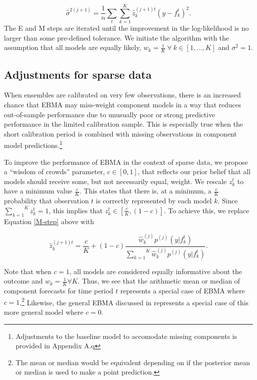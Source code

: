 \documentclass[12pt,fullpage,endnotes]{article}
\begin{document}
\begin{equation}
\label{sigma}
\hat{\sigma}^{2(j+1)}=\frac{1}{n}\underset{t}{\sum}\overset{K}{\underset{k=1}{\sum}}\hat{z}^{(j+1)t}_{k}(y-f_{k}^{t})^2.
\end{equation}
\noindent The E and M steps are iterated until the improvement in the
log-likelihood is no larger than some pre-defined tolerance.  We
initiate the algorithm with the assumption that all models are equally
likely, $w_k = \frac{1}{K} ~ \forall ~ k \in [1, \ldots, K]$ and
$\sigma^2=1$.

\subsection{Adjustments for sparse data}

When ensembles are calibrated on very few observations, there is an
increased chance that EBMA may miss-weight component models in a way
that reduces out-of-sample performance due to unusually poor or strong
predictive performance in the limited calibration sample. This is
especially true when the short calibration period is combined with
missing observations in component model
predictions.\footnote{Adjustments to the baseline model to accomodate
  missing components is provided in Appendix A.q}

To improve the performance of EBMA in the context of sparse data, we
propose a ``wisdom of crowds'' parameter, $c \in [0,1]$, that reflects
our prior belief that all models should receive some, but not
necessarily equal, weight. We rescale $z^t_k$ to have a minimum value
$\frac{c}{K}$.  This states that there is, at a minimum, a
$\frac{c}{K}$ probability that observation $t$ is correctly
represented by each model $k$.  Since
$\overset{K}{\underset{k=1}{\sum}} z_k^t = 1$, this implies that
$z_k^t \in [\frac{c}{K}, (1-c)]$.  To achieve this, we replace
Equation \ref{M-step} above with

\begin{equation}
\hat{z}^{(j+1)t}_{k} = \frac{c}{K} + (1-c)\frac{\hat{w}^{(j)}_k
p^{(j)}(y|f_{k}^{t})}{\overset{K}{\underset{k=1}{\sum}}\hat{w}^{(j)}_kp^{(j)}(y|f_{k}^{t})}.
\end{equation}

Note that when $c=1$, all models are considered equally informative
about the outcome and $w_k=\frac{1}{K} \forall K$. Thus, we see that
the arithmetic mean or median of component forecasts for time period
$t$ represents a special case of EBMA where $c=1$.\footnote{The mean
  or median would be equivalent depending on if the posterior mean or
  median is used to make a point prediction.}  Likewise, the general
EBMA discussed in \citet{mhw:2012} represents a special case of this
more general model where $c=0$.
\end{document}
